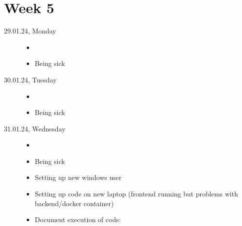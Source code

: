 \documentclass[a4, 11pt]{scrartcl}
\begin{document}
\newpage
\section*{Week 5}

\begin{description}
	
	
\item[29.01.24, Monday]
	\begin{itemize}
		\item[]
		\item Being sick \frownie{}
	\end{itemize}
	
	
	
	
	
	
	
\item[30.01.24, Tuesday]
	\begin{itemize}
		\item[]
		\item Being sick \frownie{}
	\end{itemize}





\item[31.01.24, Wednesday]
	\begin{itemize}
		\item[]
		\item Being sick \frownie{}
		\item Setting up new windows user
		\item Setting up code on new laptop (frontend running but problems with backend/docker container)
		\item Document execution of code:
	\end{itemize}




\end{description}
\vspace*{-0.8em}
\end{document}
